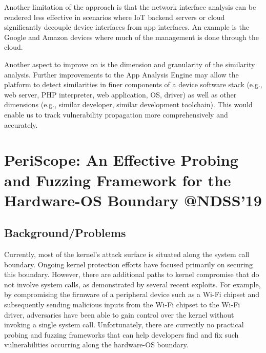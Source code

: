 Another limitation of the approach is that the network interface analysis can be rendered less effective in scenarios where IoT backend servers or cloud significantly decouple device interfaces from app interfaces. An example is the Google and Amazon devices where much of the management is done through the cloud.

Another aspect to improve on is the dimension and granularity of the similarity analysis. Further improvements to the App Analysis Engine may allow the platform to detect similarities in finer components of a device software stack (e.g., web server, PHP interpreter, web application, OS, driver) as well as other dimensions (e.g., similar developer, similar development toolchain). This would enable us to track vulnerability propagation more comprehensively and accurately. 
\newpage
\section{PeriScope: An Effective Probing and Fuzzing Framework for the Hardware-OS Boundary @NDSS'19}
\subsection{Background/Problems}
Currently, most of the kernel’s attack surface is situated along the system call boundary. Ongoing kernel protection efforts have focused primarily on securing this boundary.  However, there are additional paths to kernel compromise that do not involve system calls, as demonstrated by several recent exploits. For example, by compromising the firmware of a peripheral device such as a Wi-Fi chipset and subsequently sending malicious inputs from the Wi-Fi chipset to the Wi-Fi driver, adversaries have been able to gain control over the kernel without invoking a single system call. Unfortunately, there are currently no practical probing and fuzzing frameworks that can help developers find and fix such vulnerabilities occurring along the hardware-OS boundary.
